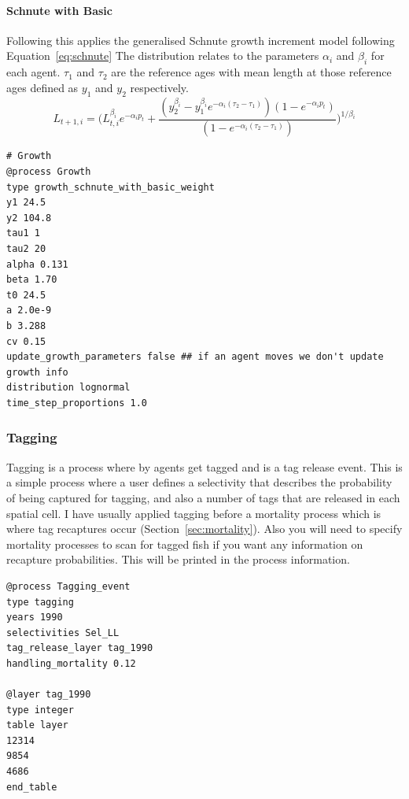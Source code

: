 \paragraph{Schnute with Basic}\label{subsubsec:schnute_basic}
Following \citep{schnute1981versatile} this applies the generalised Schnute growth increment model following Equation~\ref{eq:schnute}
The distribution relates to the parameters \(\alpha_i\) and \(\beta_i\) for each agent. \(\tau_1\) and \(\tau_2\) are the reference ages with mean length at those reference ages defined as \(y_1\) and \(y_2\) respectively.
\begin{equation}\label{eq:schnute}
	L_{t+1,i} = \bigg(L_{t,i}^{\beta_i} e^{-\alpha_i p_t} + \frac{\left( y_2^{\beta_i} - y_1^{\beta_i} e^{-\alpha_i(\tau_2 - \tau_1) }\right) \left(1 - e^{-\alpha_i p_t}\right)}{\left(1 - e^{-\alpha_i(\tau_2 - \tau_1)}\right)}\bigg)^{1/\beta_i}
\end{equation}

{\small{\begin{verbatim}
# Growth
@process Growth
type growth_schnute_with_basic_weight
y1 24.5
y2 104.8
tau1 1 
tau2 20 
alpha 0.131
beta 1.70
t0 24.5
a 2.0e-9
b 3.288
cv 0.15
update_growth_parameters false ## if an agent moves we don't update growth info
distribution lognormal
time_step_proportions 1.0
\end{verbatim}}}



\subsubsection{Tagging}\label{subsub:tag}
Tagging is a process where by agents get tagged and is a tag release event. This is a simple process where a user defines a selectivity that describes the probability of being captured for tagging, and also a number of tags that are released in each spatial cell. I have usually applied tagging before a mortality process which is where tag recaptures occur (Section~\ref{sec:mortality}). Also you will need to specify mortality processes to scan for tagged fish if you want any information on recapture probabilities. This will be printed in the process information.

{\small{\begin{verbatim}
@process Tagging_event
type tagging
years 1990
selectivities Sel_LL
tag_release_layer tag_1990
handling_mortality 0.12

@layer tag_1990
type integer
table layer
12314
9854
4686
end_table
\end{verbatim}}}

